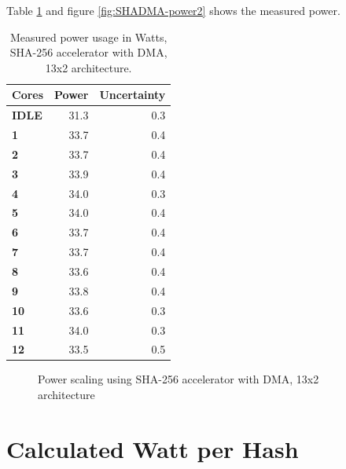 \begin{appendix}
Table \ref{tab:SHADMA-power2} and figure \ref{fig:SHADMA-power2} shows the measured power.

\begin{table}
\begin{tabular}{| l | r | r |}
  \hline 
  \textbf{Cores} & \textbf{Power} & \textbf{Uncertainty} \\
  \hline                       
  \textbf{IDLE} &  31.3 & 0.3 \\
  \textbf{1} &  33.7 & 0.4\\
  \textbf{2} &  33.7 & 0.4\\
  \textbf{3} &  33.9 & 0.4\\
  \textbf{4} &  34.0 & 0.3\\
  \textbf{5} &  34.0 & 0.4\\
  \textbf{6} &  33.7 & 0.4\\
  \textbf{7} &  33.7 & 0.4\\
  \textbf{8} &  33.6 & 0.4\\
  \textbf{9} &  33.8 & 0.4\\
  \textbf{10} &  33.6 & 0.3\\
  \textbf{11} &  34.0 & 0.3\\
  \textbf{12} &  33.5 & 0.5 \\
  \hline 
\end{tabular}
\caption{Measured power usage in Watts, SHA-256 accelerator with DMA, 13x2 architecture.}
\label{tab:SHADMA-power2}
\end{table}

\begin{figure}
	\caption{Power scaling using SHA-256 accelerator  with DMA, 13x2 architecture}
	\label{fig:SHA-power2}
\end{figure}

\chapter{Calculated Watt per Hash}




\end{appendix}

